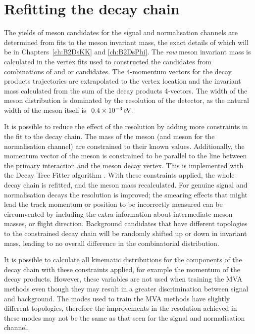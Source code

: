 \section{Refitting the decay chain}
\label{sec:decaytreefitter}

The yields of \Bp meson candidates for the signal and normalisation channels are determined from fits to the \Bp meson invariant mass, the exact details of which will be in Chapters~\ref{ch:B2DsKK} and \ref{ch:B2DsPhi}. 
The \emph{raw} \Bp meson invariant mass is calculated in the vertex fits used to constructed the \Bp candidates from combinations of \Dsp and \phiz or \Dzb candidates. The 4-momentum vectors for the decay products trajectories are extrapolated to the vertex location and the invariant mass calculated from the sum of the decay products 4-vectors. The width of the \Bp meson distribution is dominated by the resolution of the \lhcb detector, as the natural width of the meson itself is $~0.4\times 10^{-3}\mathrm{\,e\kern -0.1em V}$.

It is possible to reduce the effect of the resolution by adding more constraints in the fit to the decay chain. The mass of the \Dsp meson (and \Dzb meson for the normalisation channel) are constrained to their known values. Additionally, the momentum vector of the \Bp meson is constrained to be parallel to the line between the primary interaction and the \Bp meson decay vertex. 
This is implemented with the Decay Tree Fitter algorithm \cite{Hulsbergen:2005pu}.
With these constraints applied, the whole decay chain is refitted, and the \Bp meson mass recalculated. For genuine signal and normalisation decays the resolution is improved; the smearing effects that might lead the track momentum or position to be incorrectly measured can be circumvented by including the extra information about intermediate meson masses, or \Bp flight direction. Background candidates that have different topologies to the constrained decay chain will be randomly shifted up or down in invariant mass, leading to no overall difference in the combinatorial distribution.    


It is possible to calculate all kinematic distributions for the components of the decay chain with these constraints applied, for example the momentum of the decay products. However, these variables are not used when training the MVA methods even though they may result in a greater discrimination between signal and background. The modes used to train the MVA methods have slightly different topologies, therefore the improvements in the resolution achieved in these modes may not be the same as that seen for the signal and normalisation channel. 

